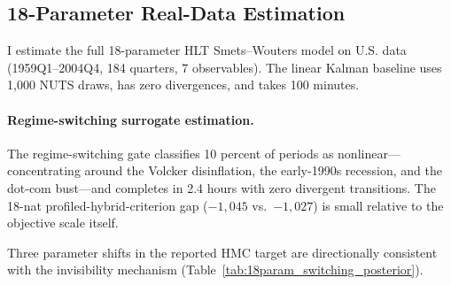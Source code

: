 \documentclass[12pt]{article}
\theoremstyle{plain}
\theoremstyle{definition}
\theoremstyle{remark}
\begin{document}
\subsection{18-Parameter Real-Data Estimation}
\label{subsec:results_18param_kalman}

I estimate the full 18-parameter HLT Smets--Wouters model on U.S. data (1959Q1--2004Q4, 184 quarters, 7 observables). The linear Kalman baseline uses 1,000 NUTS draws, has zero divergences, and takes 100 minutes.

\paragraph{Regime-switching surrogate estimation.}
\label{par:results_18param_switching}

The regime-switching gate classifies 10 percent of periods as nonlinear---concentrating around the Volcker disinflation, the early-1990s recession, and the dot-com bust---and completes in 2.4 hours with zero divergent transitions. The 18-nat profiled-hybrid-criterion gap ($-1{,}045$ vs.\ $-1{,}027$) is small relative to the objective scale itself.

Three parameter shifts in the reported HMC target are directionally consistent with the invisibility mechanism (Table~\ref{tab:18param_switching_posterior}).
\end{document}
